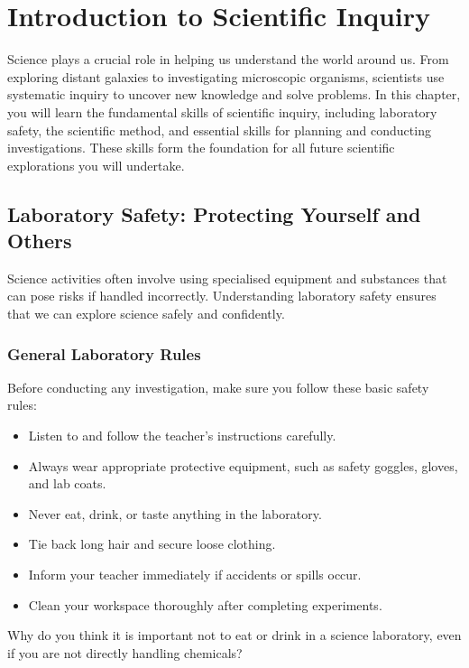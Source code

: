 \chapter{Introduction to Scientific Inquiry}

Science plays a crucial role in helping us understand the world around us. From exploring distant galaxies to investigating microscopic organisms, scientists use systematic inquiry to uncover new knowledge and solve problems. In this chapter, you will learn the fundamental skills of scientific inquiry, including laboratory safety, the scientific method, and essential skills for planning and conducting investigations. These skills form the foundation for all future scientific explorations you will undertake.

\section{Laboratory Safety: Protecting Yourself and Others}

Science activities often involve using specialised equipment and substances that can pose risks if handled incorrectly. Understanding laboratory safety ensures that we can explore science safely and confidently.

\subsection{General Laboratory Rules}

Before conducting any investigation, make sure you follow these basic safety rules:

\begin{itemize}
    \item Listen to and follow the teacher's instructions carefully.
    \item Always wear appropriate protective equipment, such as safety goggles, gloves, and lab coats.
    \item Never eat, drink, or taste anything in the laboratory.
    \item Tie back long hair and secure loose clothing.
    \item Inform your teacher immediately if accidents or spills occur.
    \item Clean your workspace thoroughly after completing experiments.
\end{itemize}

\begin{stopandthink}
Why do you think it is important not to eat or drink in a science laboratory, even if you are not directly handling chemicals?
\end{stopandthink}

